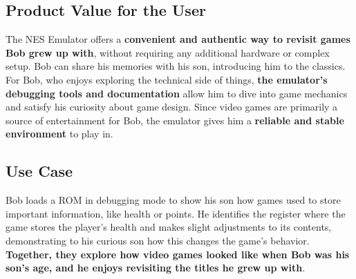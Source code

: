 \documentclass[a4paper, 11pt]{article}
\begin{document}
\subsection{Product Value for the User}
The NES Emulator offers a \textbf{convenient and authentic way to revisit games Bob grew up with}, without requiring any additional hardware or complex setup. Bob can share his memories with his son, introducing him to the classics. For Bob, who enjoys exploring the technical side of things, \textbf{the emulator's debugging tools and documentation} allow him to dive into game mechanics and satisfy his curiosity about game design. Since video games are primarily a source of entertainment for Bob, the emulator gives him a \textbf{reliable and stable environment} to play in.

\subsection{Use Case}
Bob loads a ROM in debugging mode to show his son how games used to store important information, like health or points. He identifies the register where the game stores the player's health and makes slight adjustments to its contents, demonstrating to his curious son how this changes the game's behavior. \textbf{Together, they explore how video games looked like when Bob was his son's age, and he enjoys revisiting the titles he grew up with}.
\end{document}
